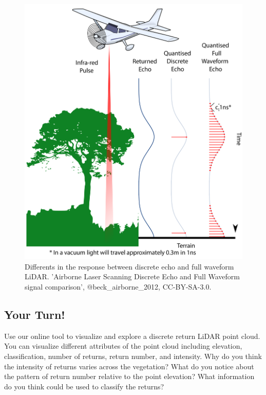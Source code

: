 \documentclass[
]{book}
\begin{document}
\begin{figure}
\includegraphics[width=0.7\linewidth]{images/15-LiDAR-Discrete-Full-Waveform} \caption{Differents in the response between discrete echo and full waveform LiDAR. 'Airborne Laser Scanning Discrete Echo and Full Waveform signal comparison', @beck_airborne_2012, CC-BY-SA-3.0.}\label{fig:15-LiDAR-Discrete-Full-Waveform}
\end{figure}

\subsection*{Your Turn!}\label{your-turn-5}

Use our online tool to visualize and explore a discrete return LiDAR point cloud. You can visualize different attributes of the point cloud including elevation, classification, number of returns, return number, and intensity. Why do you think the intensity of returns varies across the vegetation? What do you notice about the pattern of return number relative to the point elevation? What information do you think could be used to classify the returns?
\end{document}
